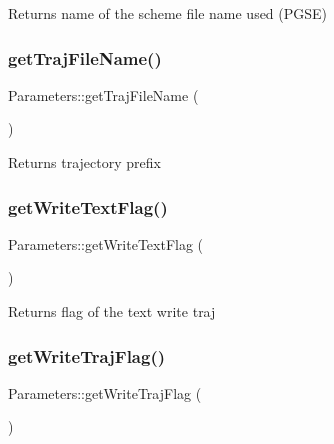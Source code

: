 \begin{DoxyReturn}{Returns}
name of the scheme file name used (P\+G\+SE) 
\end{DoxyReturn}
\mbox{\label{class_parameters_a38057c2ae3d11b578c8f199d73683ee1}} 
\subsubsection{\texorpdfstring{get\+Traj\+File\+Name()}{getTrajFileName()}}
{\footnotesize\ttfamily Parameters\+::get\+Traj\+File\+Name (\begin{DoxyParamCaption}{ }\end{DoxyParamCaption})}

\begin{DoxyReturn}{Returns}
trajectory prefix 
\end{DoxyReturn}
\mbox{\label{class_parameters_adb6064f329732640c226608d6e1ddb60}} 
\subsubsection{\texorpdfstring{get\+Write\+Text\+Flag()}{getWriteTextFlag()}}
{\footnotesize\ttfamily Parameters\+::get\+Write\+Text\+Flag (\begin{DoxyParamCaption}{ }\end{DoxyParamCaption})}

\begin{DoxyReturn}{Returns}
flag of the text write traj 
\end{DoxyReturn}
\mbox{\label{class_parameters_a21817e9a0207da2adf32611bcaf889ef}} 
\subsubsection{\texorpdfstring{get\+Write\+Traj\+Flag()}{getWriteTrajFlag()}}
{\footnotesize\ttfamily Parameters\+::get\+Write\+Traj\+Flag (\begin{DoxyParamCaption}{ }\end{DoxyParamCaption})}


